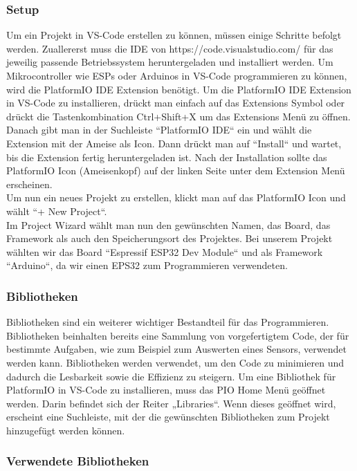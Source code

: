 \documentclass[ngerman,12pt,a4paper]{article}
\begin{document}
	 	\subsubsection{Setup}
	 Um ein Projekt in VS-Code erstellen zu können, müssen einige Schritte befolgt werden. Zuallererst muss die IDE von https://code.visualstudio.com/ für das jeweilig passende Betriebssystem heruntergeladen und installiert werden. Um Mikrocontroller wie ESPs oder Arduinos in VS-Code programmieren zu können, wird die PlatformIO IDE Extension benötigt. Um die PlatformIO IDE Extension in VS-Code zu installieren, drückt man einfach auf das Extensions Symbol oder drückt die Tastenkombination Ctrl+Shift+X um das Extensions Menü zu öffnen. Danach gibt man in der Suchleiste “PlatformIO IDE“ ein und wählt die Extension mit der Ameise als Icon. Dann drückt man auf “Install“ und wartet, bis die Extension fertig heruntergeladen ist. Nach der Installation sollte das PlatformIO Icon (Ameisenkopf) auf der linken Seite unter dem Extension Menü erscheinen. \\[0.5cm]
	 Um nun ein neues Projekt zu erstellen, klickt man auf das PlatformIO Icon und wählt “+ New Project“. \\[0.5cm]
	 Im Project Wizard wählt man nun den gewünschten Namen, das Board, das Framework als auch den Speicherungsort des Projektes. Bei unserem Projekt wählten wir das Board “Espressif ESP32 Dev Module“ und als Framework “Arduino“, da wir einen EPS32 zum Programmieren verwendeten. \\[0.5cm]
	 	
	 	
	 	\subsubsection{Bibliotheken}
	 	
	 Bibliotheken sind ein weiterer wichtiger Bestandteil für das Programmieren. Bibliotheken beinhalten bereits eine Sammlung von vorgefertigtem Code, der für bestimmte Aufgaben, wie zum Beispiel zum Auswerten eines Sensors, verwendet werden kann. Bibliotheken werden verwendet, um den Code zu minimieren und dadurch die Lesbarkeit sowie die Effizienz zu steigern. Um eine Bibliothek für PlatformIO in VS-Code zu installieren, muss das PIO Home Menü geöffnet werden. Darin befindet sich der Reiter „Libraries“. Wenn dieses geöffnet wird, erscheint eine Suchleiste, mit der die gewünschten Bibliotheken zum Projekt hinzugefügt werden können.
	 
		\subsubsection{Verwendete Bibliotheken}
		
\end{document}
